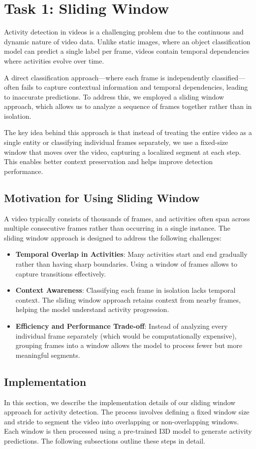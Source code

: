 \documentclass{article}
\begin{document}
\section{Task 1: Sliding Window}
Activity detection in videos is a challenging problem due to the continuous and dynamic nature of video data. Unlike static images, where an object classification model can predict a single label per frame, videos contain temporal dependencies where activities evolve over time.

A direct classification approach—where each frame is independently classified—often fails to capture contextual information and temporal dependencies, leading to inaccurate predictions. To address this, we employed a sliding window approach, which allows us to analyze a sequence of frames together rather than in isolation.

The key idea behind this approach is that instead of treating the entire video as a single entity or classifying individual frames separately, we use a fixed-size window that moves over the video, capturing a localized segment at each step. This enables better context preservation and helps improve detection performance.

\subsection{Motivation for Using Sliding Window}
A video typically consists of thousands of frames, and activities often span across multiple consecutive frames rather than occurring in a single instance. The sliding window approach is designed to address the following challenges:
\begin{itemize}
    \item \textbf{Temporal Overlap in Activities}: Many activities start and end gradually rather than having sharp boundaries. Using a window of frames allows to capture transitions effectively.
    \item \textbf{Context Awareness}: Classifying each frame in isolation lacks temporal context. The sliding window approach retains context from nearby frames, helping the model understand activity progression.
    \item \textbf{Efficiency and Performance Trade-off}: Instead of analyzing every individual frame separately (which would be computationally expensive), grouping frames into a window allows the model to process fewer but more meaningful segments.
\end{itemize}
\newpage
\subsection{Implementation}
In this section, we describe the implementation details of our sliding window approach for activity detection. The process involves defining a fixed window size and stride to segment the video into overlapping or non-overlapping windows. Each window is then processed using a pre-trained I3D model to generate activity predictions. The following subsections outline these steps in detail.
\end{document}
